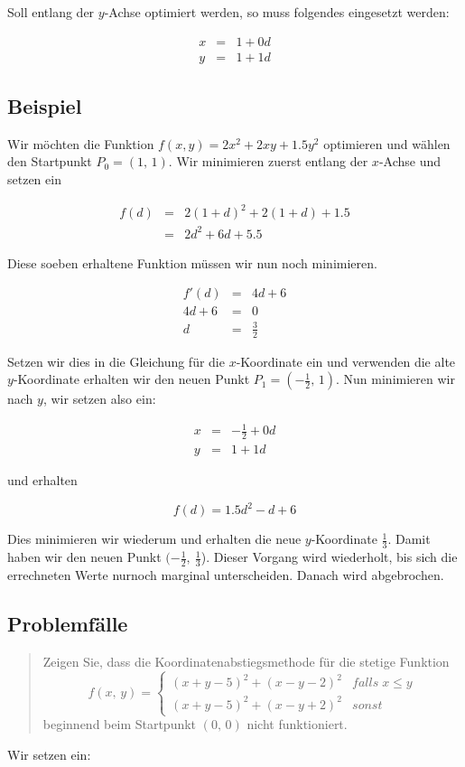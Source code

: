 \documentclass[naustrian]{article}
\begin{document}
{Soll entlang der $y$-Achse optimiert werden, so muss folgendes eingesetzt
werden:

\begin{eqnarray*}
    x & = & 1+0d\\
    y & = & 1+1d
\end{eqnarray*}



\subsection{Beispiel}

Wir möchten die Funktion $f(x,y)=2x^{2}+2xy+1.5y^{2}$ optimieren
und wählen den Startpunkt $P_{0}=(1,\,1)$. Wir minimieren zuerst
entlang der $x$-Achse und setzen ein

\begin{eqnarray*}
    f(d) & = & 2(1+d)^{2}+2(1+d)+1.5\\
    & = & 2d^{2}+6d+5.5
\end{eqnarray*}

Diese soeben erhaltene Funktion müssen wir nun noch minimieren.

\begin{eqnarray*}
    f'(d) & = & 4d+6\\
    4d+6 & = & 0\\
    d & = & \frac{3}{2}
\end{eqnarray*}


Setzen wir dies in die Gleichung für die $x$-Koordinate ein und verwenden
die alte $y$-Koordinate erhalten wir den neuen Punkt $P_{1}=(-\frac{1}{2},\,1)$.
Nun minimieren wir nach $y$, wir setzen also ein:

\begin{eqnarray*}
    x & = & -\frac{1}{2}+0d\\
    y & = & 1+1d
\end{eqnarray*}


und erhalten

\[
    f(d)=1.5d^{2}-d+6
\]

Dies minimieren wir wiederum und erhalten die neue $y$-Koordinate
$\frac{1}{3}$. Damit haben wir den neuen Punkt $(-\frac{1}{2},\:\frac{1}{3}$).
Dieser Vorgang wird wiederholt, bis sich die errechneten Werte nurnoch
marginal unterscheiden. Danach wird abgebrochen.


\subsection{Problemfälle}
\begin{quotation}
    \noindent Zeigen Sie, dass die Koordinatenabstiegsmethode für die stetige Funktion
    \[
        f(x,\,y)=
        \begin{cases}
            (x+y-5)^{2}+(x-y-2)^{2} & falls\;x\le y\\
            (x+y-5)^{2}+(x-y+2)^{2} & sonst
        \end{cases}
    \]
    beginnend beim Startpunkt $(0,\,0)$ nicht funktioniert.
\end{quotation}
Wir setzen ein:

}
\end{document}
